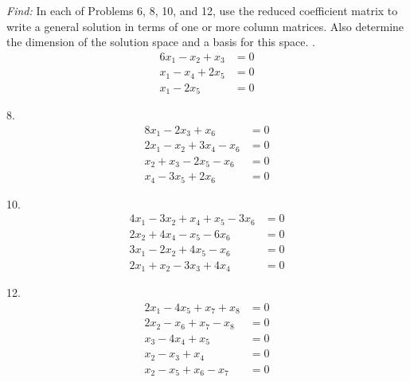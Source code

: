 \documentclass[11pt]{homework}
\begin{document}
\emph{Find:}
\newline
In each of Problems 6, 8, 10, and 12, 
use the reduced coefficient matrix to write a general solution 
 in terms of one or more column matrices. 
Also determine the dimension of the solution space
and a basis for this space.
. 
\begin{align*}
6 x_1 - x_2 +x_3 &= 0 \\
x_1 - x_4 + 2 x_5 &= 0 \\
x_1 - 2 x_5 &= 0 
\end{align*}

8.
\begin{align*}
8x_1 -2 x_3 +x_6 &= 0 \\
2x_1 - x_2 +3 x_4 - x_6 &=0 \\
x_2 +x_3 - 2 x_5 -x_6 &= 0 \\
x_4 - 3 x_5 +2 x_6 &= 0 
\end{align*}

10.
\begin{align*}
4 x_1 - 3 x_2 +x_4 +x_5 - 3 x_6 &= 0 \\
2x_2 +4x_4 -x_5 -6x_6 &= 0 \\
3x_1 - 2x_2 +4 x_5 - x_6 &= 0\\
2x_1 + x_2 - 3 x_3 +4 x_4 &= 0
\end{align*}

12. 
\begin{align*}
2x_1 - 4 x_5 + x_7 +x_8 &= 0\\
2x_2 - x_6 + x_7 - x_8 &= 0 \\
x_3 - 4 x_4 + x_5 &= 0 \\
x_2 - x_3 + x_4 &= 0 \\
x_2 - x_5 + x_6 - x_7 &= 0 
\end{align*}
\end{document}
